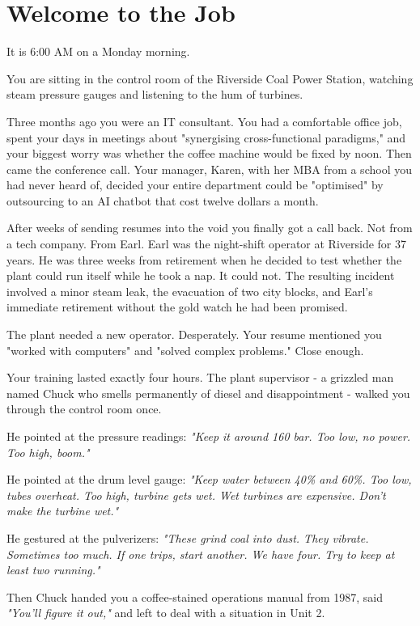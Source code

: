 \documentclass[10pt,a5paper]{article}
\begin{document}
\section{Welcome to the Job}

It is 6:00 AM on a Monday morning.

You are sitting in the control room of the Riverside Coal Power Station, 
watching steam pressure gauges and listening to the hum of turbines.

Three months ago you were an IT consultant. You had a comfortable office job,
spent your days in meetings about "synergising cross-functional paradigms,"
and your biggest worry was whether the coffee machine would be fixed by noon.
Then came the conference call. Your manager, Karen, with her MBA from a school
you had never heard of, decided your entire department could be "optimised"
by outsourcing to an AI chatbot that cost twelve dollars a month.

After weeks of sending resumes into the void you finally got a call back. Not
from a tech company. From Earl. Earl was the night-shift operator at Riverside
for 37 years. He was three weeks from retirement when he decided to test whether
the plant could run itself while he took a nap. It could not. The resulting
incident involved a minor steam leak, the evacuation of two city blocks, and
Earl's immediate retirement without the gold watch he had been promised.

The plant needed a new operator. Desperately. Your resume mentioned you
"worked with computers" and "solved complex problems." Close enough.

Your training lasted exactly four hours. The plant supervisor - a grizzled man
named Chuck who smells permanently of diesel and disappointment - walked you
through the control room once.

He pointed at the pressure readings: \textit{"Keep it around 160 bar. Too low,
no power. Too high, boom."}

He pointed at the drum level gauge: \textit{"Keep water between 40\% and 60\%.
Too low, tubes overheat. Too high, turbine gets wet. Wet turbines are expensive.
Don't make the turbine wet."}

He gestured at the pulverizers: \textit{"These grind coal into dust. They
vibrate. Sometimes too much. If one trips, start another. We have four. Try to
keep at least two running."}

Then Chuck handed you a coffee-stained operations manual from 1987, said
\textit{"You'll figure it out,"} and left to deal with a situation in Unit 2.
\end{document}
